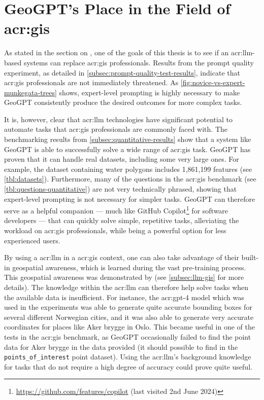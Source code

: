 \section[GeoGPT's Place in the Field of GIS]{GeoGPT's Place in the Field of \acrshort{acr:gis}}
\label{sec:geogpt-in-gis}

As stated in the section on , one of the goals of this thesis is to see if an \acrshort{acr:llm}-based systems can replace \acrshort{acr:gis} professionals. Results from the prompt quality experiment, as detailed in \autoref{subsec:prompt-quality-test-results}, indicate that \acrshort{acr:gis} professionals are not immediately threatened. As \autoref{fig:novice-vs-expert-munkegata-trees} shows, expert-level prompting is highly necessary to make GeoGPT consistently produce the desired outcomes for more complex tasks.

It is, however, clear that \acrshort{acr:llm} technologies have significant potential to automate tasks that \acrshort{acr:gis} professionals are commonly faced with. The benchmarking results from \autoref{subsec:quantitative-results} show that a system like GeoGPT is able to successfully solve a wide range of \acrshort{acr:gis} task. GeoGPT has proven that it can handle real datasets, including some very large ones. For example, the dataset containing water polygons includes 1,861,199 features (see \autoref{tbl:datasets}). Furthermore, many of the questions in the \acrshort{acr:gis} benchmark (see \autoref{tbl:questions-quantitative}) are not very technically phrased, showing that expert-level prompting is not necessary for simpler tasks. GeoGPT can therefore serve as a helpful companion --- much like GitHub Copilot\footnote{\url{https://github.com/features/copilot} (last visited 2nd June 2024)} for software developers --- that can quickly solve simple, repetitive tasks, alleviating the workload on \acrshort{acr:gis} professionals, while being a powerful option for less experienced users.

By using a \acrlong{acr:llm} in a \acrshort{acr:gis} context, one can also take advantage of their built-in geospatial awareness, which is learned during the vast pre-training process. This geospatial awareness was demonstrated by \cite{robertsGPT4GEOHowLanguage2023} (see \autoref{subsec:llm-gis} for more details). The knowledge within the \acrshort{acr:llm} can therefore help solve tasks when the available data is insufficient. For instance, the \acrshort{acr:gpt}-4 model which was used in the experiments was able to generate quite accurate bounding boxes for several different Norwegian cities, and it was also able to generate very accurate coordinates for places like Aker brygge in Oslo. This became useful in one of the tests in the \acrshort{acr:gis} benchmark, as GeoGPT occasionally failed to find the point data for Aker brygge in the data provided (it should possible to find in the \texttt{points\_of\_interest} point dataset). Using the \acrshort{acr:llm}'s background knowledge for tasks that do not require a high degree of accuracy could prove quite useful.

